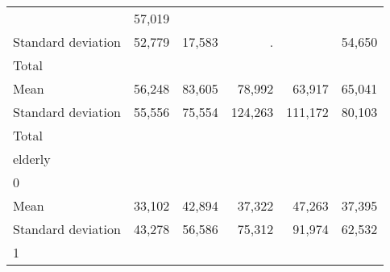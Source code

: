 \begin{tabular}{llllll}
  \multicolumn{1}{r}{} &
  \multicolumn{1}{r}{57,019} \\
\multicolumn{1}{l}{\hspace{4em}Standard deviation} &
  \multicolumn{1}{|r}{52,779} &
  \multicolumn{1}{r}{17,583} &
  \multicolumn{1}{r}{.} &
  \multicolumn{1}{r}{} &
  \multicolumn{1}{r}{54,650} \\
\multicolumn{1}{l}{\hspace{3em}Total} &
  \multicolumn{1}{|r}{} &
  \multicolumn{1}{r}{} &
  \multicolumn{1}{r}{} &
  \multicolumn{1}{r}{} &
  \multicolumn{1}{r}{} \\
\multicolumn{1}{l}{\hspace{4em}Mean} &
  \multicolumn{1}{|r}{56,248} &
  \multicolumn{1}{r}{83,605} &
  \multicolumn{1}{r}{78,992} &
  \multicolumn{1}{r}{63,917} &
  \multicolumn{1}{r}{65,041} \\
\multicolumn{1}{l}{\hspace{4em}Standard deviation} &
  \multicolumn{1}{|r}{55,556} &
  \multicolumn{1}{r}{75,554} &
  \multicolumn{1}{r}{124,263} &
  \multicolumn{1}{r}{111,172} &
  \multicolumn{1}{r}{80,103} \\
\multicolumn{1}{l}{\hspace{1em}Total} &
  \multicolumn{1}{|r}{} &
  \multicolumn{1}{r}{} &
  \multicolumn{1}{r}{} &
  \multicolumn{1}{r}{} &
  \multicolumn{1}{r}{} \\
\multicolumn{1}{l}{\hspace{2em}elderly} &
  \multicolumn{1}{|r}{} &
  \multicolumn{1}{r}{} &
  \multicolumn{1}{r}{} &
  \multicolumn{1}{r}{} &
  \multicolumn{1}{r}{} \\
\multicolumn{1}{l}{\hspace{3em}0} &
  \multicolumn{1}{|r}{} &
  \multicolumn{1}{r}{} &
  \multicolumn{1}{r}{} &
  \multicolumn{1}{r}{} &
  \multicolumn{1}{r}{} \\
\multicolumn{1}{l}{\hspace{4em}Mean} &
  \multicolumn{1}{|r}{33,102} &
  \multicolumn{1}{r}{42,894} &
  \multicolumn{1}{r}{37,322} &
  \multicolumn{1}{r}{47,263} &
  \multicolumn{1}{r}{37,395} \\
\multicolumn{1}{l}{\hspace{4em}Standard deviation} &
  \multicolumn{1}{|r}{43,278} &
  \multicolumn{1}{r}{56,586} &
  \multicolumn{1}{r}{75,312} &
  \multicolumn{1}{r}{91,974} &
  \multicolumn{1}{r}{62,532} \\
\multicolumn{1}{l}{\hspace{3em}1} &
  \multicolumn{1}{|r}{} &
  \multicolumn{1}{r}{} &

\end{tabular}

